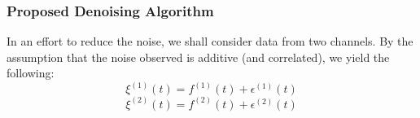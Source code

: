 \documentclass[onecolumn, groupedaddress, 10pt]{revtex4-1}
\begin{document}
\subsubsection{Proposed Denoising Algorithm}
In an effort to reduce the noise, we shall consider data from two channels. By the assumption that the noise observed is additive (and correlated), we yield the following:
\begin{equation}
\xi^{(1)}(t) = f^{(1)}(t) + \epsilon^{(1)}(t)
\end{equation}
\begin{equation}
\xi^{(2)}(t) = f^{(2)}(t) + \epsilon^{(2)}(t)
\end{equation}

\end{document}
